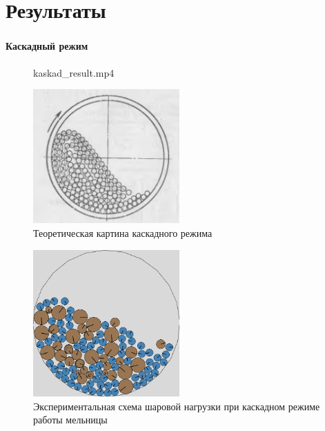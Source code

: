 \documentclass[c]{beamer}  %
\begin{document}
\section{Результаты}

\begin{frame}
\frametitle{\insertsection} 
\framesubtitle{Каскадный режим}
	\begin{figure}[ht]
     		{kaskad_result.mp4}
\end{figure}
{
\begin{figure}[H]
	\centering
	\includegraphics[width=0.5\textwidth]{kaskad_theory} 
	\caption{Теоретическая картина каскадного режима}
\end{figure}
}
{
\begin{figure}[H]
	\centering
	\includegraphics[width=0.5\textwidth]{kaskad_result} 
	\caption{Экспериментальная схема шаровой нагрузки при каскадном режиме работы мельницы}
	\label{pic:kaskad_result}
\end{figure} 
}
{

}
\end{frame}
\end{document}
